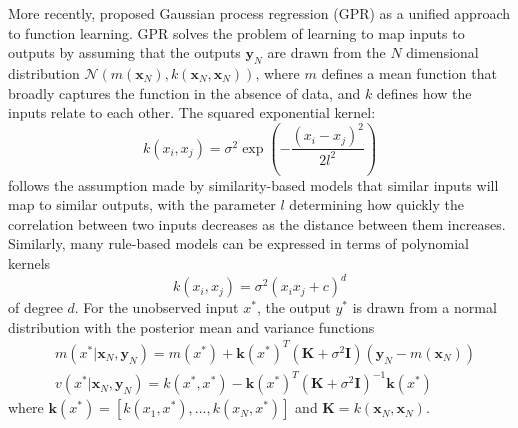 \documentclass[10pt,letterpaper]{article}
\begin{document}
	More recently, \cite{Lucas} proposed Gaussian process regression (GPR) as a unified approach to function learning. GPR solves the problem of learning to map inputs to outputs by assuming that the outputs $\mathbf{y}_{N}$ are drawn from the $N$ dimensional distribution $\mathcal{N}(m(\mathbf{x}_{N}),k(\mathbf{x}_{N},\mathbf{x}_{N}))$, where $m$ defines a mean function that broadly captures the function in the absence of data, and $k$ defines how the inputs relate to each other. The squared exponential kernel:
	\begin{equation}
	k(x_{i},x_{j}) = \sigma^{2}\exp(-\frac{(x_{i}-x_{j})^{2}}{2l^{2}})
	\end{equation}
	follows the assumption made by similarity-based models that similar inputs will map to similar outputs, with the parameter $l$ determining how quickly the correlation between two inputs decreases as the distance between them increases. Similarly, many rule-based models can be expressed in terms of polynomial kernels 
	\begin{equation}
	k(x_{i}, x_{j}) = \sigma^{2} (x_{i}x_{j} + c)^{d}
	\end{equation}
	of degree $d$. For the unobserved input $x^{*}$, the output $y^{*}$ is drawn from a normal distribution with the posterior mean and variance functions
	\begin{equation}
	\begin{split}
	& m(x^{*} | \mathbf{x}_{N}, \mathbf{y}_{N}) = m(x^{*}) + \mathbf{k}(x^{*})^{T}(\mathbf{K} + \sigma^{2} \mathbf{I}) (\mathbf{y}_{N}-m(\mathbf{x}_{N})) \\
	& v(x^{*} | \mathbf{x}_{N}, \mathbf{y}_{N}) = k(x^{*},x^{*}) - \mathbf{k}(x^{*})^{T}(\mathbf{K} + \sigma^{2} \mathbf{I})^{-1}\mathbf{k}(x^{*})
	\end{split}
	\end{equation}
	 where $\mathbf{k}(x^{*}) = [k(x_{1},x^{*}),...,k(x_{N},x^{*})]$ and $\mathbf{K} = k(\mathbf{x}_{N}, \mathbf{x}_{N})$.
	
\end{document}
